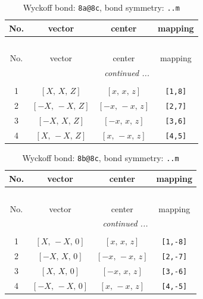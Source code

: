 \documentclass[fleqn,8pt]{jsarticle}
\begin{document}
\begin{longtable}{cccc}
\caption{Wyckoff bond: {\tt 8a@8c}, bond symmetry: {\tt ..m}}
 \\
 \hline \hline
No. & vector & center & mapping \\ \hline \endfirsthead

\multicolumn{3}{l}{\tablename\ \thetable{}} \\
 \hline \hline
No. & vector & center & mapping \\ \hline \endhead

 \hline \hline
\multicolumn{3}{r}{\footnotesize\it continued ...} \\ \endfoot

 \hline \hline
\multicolumn{3}{r}{} \\ \endlastfoot

1 & $\left[ X,\, X,\, Z \right]$ & $\left[ x,\, x,\, z \right]$ & {\tt [1,8]} \\ \hline
2 & $\left[ - X,\, - X,\, Z \right]$ & $\left[ - x,\, - x,\, z \right]$ & {\tt [2,7]} \\ \hline
3 & $\left[ - X,\, X,\, Z \right]$ & $\left[ - x,\, x,\, z \right]$ & {\tt [3,6]} \\ \hline
4 & $\left[ X,\, - X,\, Z \right]$ & $\left[ x,\, - x,\, z \right]$ & {\tt [4,5]} \\
\end{longtable}
\renewcommand{\arraystretch}{1.2}
\begin{longtable}{cccc}
\caption{Wyckoff bond: {\tt 8b@8c}, bond symmetry: {\tt ..m}}
 \\
 \hline \hline
No. & vector & center & mapping \\ \hline \endfirsthead

\multicolumn{3}{l}{\tablename\ \thetable{}} \\
 \hline \hline
No. & vector & center & mapping \\ \hline \endhead

 \hline \hline
\multicolumn{3}{r}{\footnotesize\it continued ...} \\ \endfoot

 \hline \hline
\multicolumn{3}{r}{} \\ \endlastfoot

1 & $\left[ X,\, - X,\, 0 \right]$ & $\left[ x,\, x,\, z \right]$ & {\tt [1,-8]} \\ \hline
2 & $\left[ - X,\, X,\, 0 \right]$ & $\left[ - x,\, - x,\, z \right]$ & {\tt [2,-7]} \\ \hline
3 & $\left[ X,\, X,\, 0 \right]$ & $\left[ - x,\, x,\, z \right]$ & {\tt [3,-6]} \\ \hline
4 & $\left[ - X,\, - X,\, 0 \right]$ & $\left[ x,\, - x,\, z \right]$ & {\tt [4,-5]} \\
\end{longtable}
\end{document}
